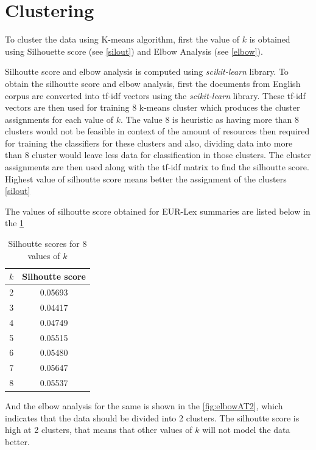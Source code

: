 \section{Clustering} \label{clustering}

To cluster the data using K-means algorithm, first the value of $k$ is obtained using Silhouette score (see \ref{silout})  and Elbow Analysis (see \ref{elbow}). 

Silhoutte score and elbow analysis is computed using \textit{scikit-learn} library. To obtain the silhoutte score and elbow analysis, first the documents from English corpus are converted into tf-idf vectors using the \textit{scikit-learn} library. These tf-idf vectors are then used for training $8$ k-means cluster which produces the cluster assignments for each value of $k$. The value 8 is heuristic as having more than 8 clusters would not be feasible in context of the amount of resources then required for training the classifiers for these clusters and also, dividing data into more than 8 cluster would leave less data for classification in those clusters. The cluster assignments are then used along with the tf-idf matrix to find the silhoutte score. Highest value of silhoutte score means better the assignment of the clusters \ref{silout}

The values of silhoutte score obtained for EUR-Lex summaries are listed below in the \ref{table:silhoutteScore}
\begin{table}[!ht]
\centering
\begin{tabular}{cc}
\hline
$k$ & Silhoutte score \\ \hline
2 & 0.05693 \\
3 & 0.04417 \\
4 & 0.04749 \\
5 & 0.05515 \\
6 & 0.05480 \\
7 & 0.05647 \\
8 & 0.05537 \\ \hline
\end{tabular}
\caption{Silhoutte scores for 8 values of $k$}
\label{table:silhoutteScore}
\end{table}

And the elbow analysis for the same is shown in the \ref{fig:elbowAT2}, which indicates that the data should be divided into 2 clusters. The silhoutte score is high at 2 clusters, that means that other values of $k$ will not model the data better. 

